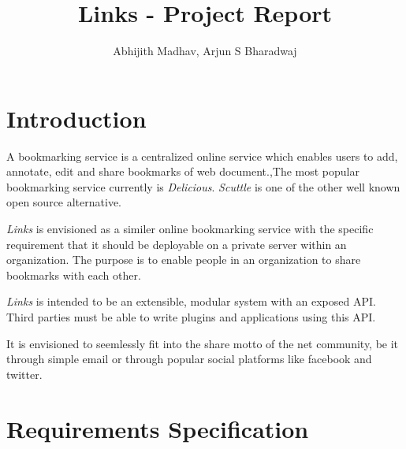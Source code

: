 \documentclass[11pt]{report} %
\title{Links - Project Report}
\author{Abhijith Madhav, Arjun S Bharadwaj}
\begin{document}
\maketitle

\tableofcontents
\chapter{Introduction}

A bookmarking service is a centralized online service which enables users to add, annotate, edit and share bookmarks of web document.,The most popular bookmarking service currently is \emph{Delicious}. \emph{Scuttle} is one of the other well known open source alternative. 


\emph {Links} is envisioned as a similer online bookmarking service with the specific requirement that it should be deployable on a private server within an organization. The purpose is to enable people in an organization to share bookmarks with each other.



\emph {Links} is intended to be an extensible, modular system with an exposed API. Third parties must be able to write plugins and applications using this API.


It is envisioned to seemlessly fit into the share motto of the net community, be it through simple email or through popular social platforms like facebook and twitter.



\chapter{Requirements Specification}
\end{document}
